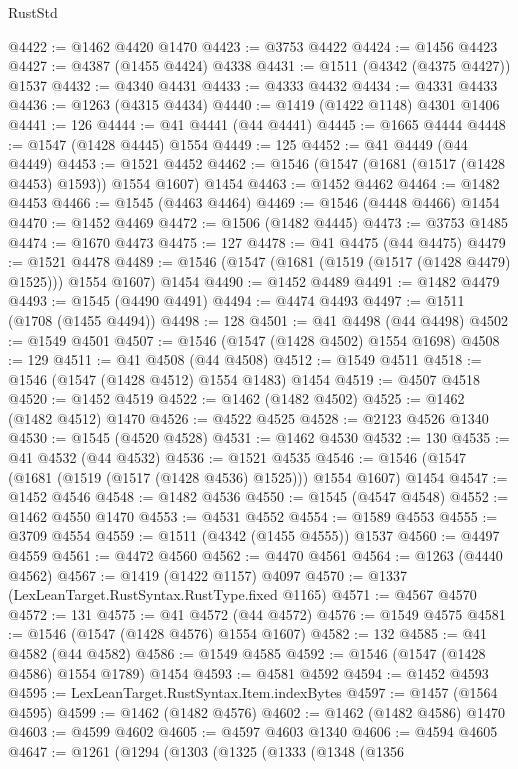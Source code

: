 \begin{lexlean}{RustStd}
\begin{coremodule}
@4422 := @1462 @4420 @1470
@4423 := @3753 @4422
@4424 := @1456 @4423
@4427 := @4387 (@1455 @4424) @4338
@4431 := @1511 (@4342 (@4375 @4427)) @1537
@4432 := @4340 @4431
@4433 := @4333 @4432
@4434 := @4331 @4433
@4436 := @1263 (@4315 @4434)
@4440 := @1419 (@1422 @1148) @4301 @1406
@4441 := 126
@4444 := @41 @4441 (@44 @4441)
@4445 := @1665 @4444
@4448 := @1547 (@1428 @4445) @1554
@4449 := 125
@4452 := @41 @4449 (@44 @4449)
@4453 := @1521 @4452
@4462 := @1546 (@1547 (@1681 (@1517 (@1428 @4453) @1593)) @1554 @1607) @1454
@4463 := @1452 @4462
@4464 := @1482 @4453
@4466 := @1545 (@4463 @4464)
@4469 := @1546 (@4448 @4466) @1454
@4470 := @1452 @4469
@4472 := @1506 (@1482 @4445)
@4473 := @3753 @1485
@4474 := @1670 @4473
@4475 := 127
@4478 := @41 @4475 (@44 @4475)
@4479 := @1521 @4478
@4489 := @1546 (@1547 (@1681 (@1519 (@1517 (@1428 @4479) @1525))) @1554 @1607) @1454
@4490 := @1452 @4489
@4491 := @1482 @4479
@4493 := @1545 (@4490 @4491)
@4494 := @4474 @4493
@4497 := @1511 (@1708 (@1455 @4494))
@4498 := 128
@4501 := @41 @4498 (@44 @4498)
@4502 := @1549 @4501
@4507 := @1546 (@1547 (@1428 @4502) @1554 @1698)
@4508 := 129
@4511 := @41 @4508 (@44 @4508)
@4512 := @1549 @4511
@4518 := @1546 (@1547 (@1428 @4512) @1554 @1483) @1454
@4519 := @4507 @4518
@4520 := @1452 @4519
@4522 := @1462 (@1482 @4502)
@4525 := @1462 (@1482 @4512) @1470
@4526 := @4522 @4525
@4528 := @2123 @4526 @1340
@4530 := @1545 (@4520 @4528)
@4531 := @1462 @4530
@4532 := 130
@4535 := @41 @4532 (@44 @4532)
@4536 := @1521 @4535
@4546 := @1546 (@1547 (@1681 (@1519 (@1517 (@1428 @4536) @1525))) @1554 @1607) @1454
@4547 := @1452 @4546
@4548 := @1482 @4536
@4550 := @1545 (@4547 @4548)
@4552 := @1462 @4550 @1470
@4553 := @4531 @4552
@4554 := @1589 @4553
@4555 := @3709 @4554
@4559 := @1511 (@4342 (@1455 @4555)) @1537
@4560 := @4497 @4559
@4561 := @4472 @4560
@4562 := @4470 @4561
@4564 := @1263 (@4440 @4562)
@4567 := @1419 (@1422 @1157) @4097
@4570 := @1337 (LexLeanTarget.RustSyntax.RustType.fixed @1165)
@4571 := @4567 @4570
@4572 := 131
@4575 := @41 @4572 (@44 @4572)
@4576 := @1549 @4575
@4581 := @1546 (@1547 (@1428 @4576) @1554 @1607)
@4582 := 132
@4585 := @41 @4582 (@44 @4582)
@4586 := @1549 @4585
@4592 := @1546 (@1547 (@1428 @4586) @1554 @1789) @1454
@4593 := @4581 @4592
@4594 := @1452 @4593
@4595 := LexLeanTarget.RustSyntax.Item.indexBytes
@4597 := @1457 (@1564 @4595)
@4599 := @1462 (@1482 @4576)
@4602 := @1462 (@1482 @4586) @1470
@4603 := @4599 @4602
@4605 := @4597 @4603 @1340
@4606 := @4594 @4605
@4647 := @1261
    (@1294
      (@1303
        (@1325
          (@1333
            (@1348
              (@1356

\end{coremodule}
\end{lexlean}
